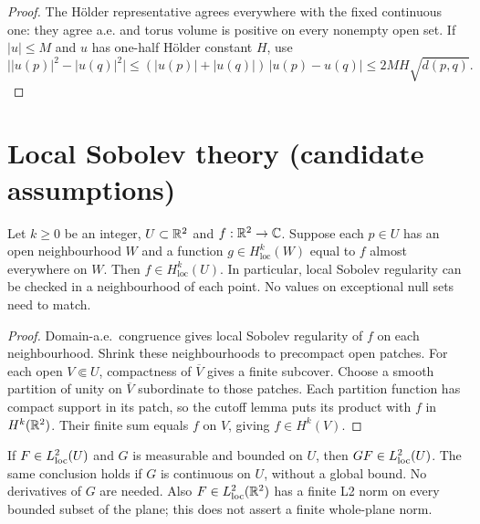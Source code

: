 \begin{proof}
\leanok
The H\"older representative agrees everywhere with the fixed continuous
one: they agree a.e. and torus volume is positive on every nonempty open set.
If $|u|\le M$ and $u$ has one-half H\"older constant $H$, use
\[
 \big||u(p)|^2-|u(q)|^2\big|
 \le (|u(p)|+|u(q)|)\,|u(p)-u(q)|
 \le2MH\sqrt{d(p,q)}.
\]
\end{proof}

\section{Local Sobolev theory (candidate assumptions)}
\label{sec:local-sobolev}

\begin{lemma}
\label{lem:sobolev-local-gluing}
\leanok
Let $k\ge0$ be an integer, $U\subset\mathbb{R}^2$ and $f:\mathbb{R}^2\to\mathbb{C}$.
Suppose each $p\in U$ has an open neighbourhood $W$ and a function
$g\in H^k_{\mathrm{loc}}(W)$ equal to $f$ almost everywhere on $W$.
Then $f\in H^k_{\mathrm{loc}}(U)$. In particular, local Sobolev
regularity can be checked in a neighbourhood of each point.
No values on exceptional null sets need to match.
\end{lemma}

\begin{proof}
\leanok
Domain-a.e.\ congruence gives local Sobolev regularity of $f$ on each
neighbourhood. Shrink these neighbourhoods to precompact open patches.
For each open $V\Subset U$, compactness of $\overline V$ gives a finite
subcover. Choose a smooth partition of unity on $\overline V$ subordinate
to those patches. Each partition function has compact support in its
patch, so the cutoff lemma puts its product with $f$ in $H^k(\mathbb{R}^2)$.
Their finite sum equals $f$ on $V$, giving $f\in H^k(V)$.
\end{proof}

\begin{lemma}
\label{lem:local-l2-multiplier}
\leanok
If $F\in L^2_{\rm loc}(U)$ and $G$ is measurable and bounded on $U$, then
$GF\in L^2_{\rm loc}(U)$. The same conclusion holds if $G$ is continuous
on $U$, without a global bound. No derivatives of $G$ are needed.
Also $F\in L^2_{\rm loc}(\mathbb{R}^2)$ has a finite L2 norm on every bounded
subset of the plane; this does not assert a finite whole-plane norm.
\end{lemma}


